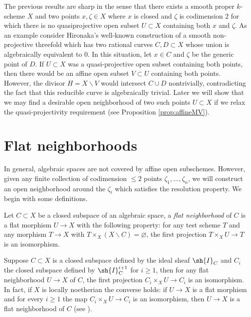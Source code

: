 \documentclass[12pt]{amsart}
\begin{document}
\begin{remark} The previous results are sharp in the sense that there exists a smooth proper $k$-scheme $X$ and two points $x,\zeta \in X$ where $x$ is closed and $\zeta$ is codimension $2$ for which there is no quasiprojective open subset $U \subset X$ containing both $x$ and $\zeta$. As an example consider Hironaka's well-known construction of a smooth non-projective threefold which has two rational curves $C,D \subset X$ whose union is algebraically equivalent to $0$. In this situation, let $x \in C$ and $\zeta$ be the generic point of $D$. If $U \subset X$ was a quasi-projective open subset containing both points, then there would be an affine open subset $V \subset U$ containing both points. However, the divisor $H=X \smallsetminus V$ would intersect $C \cup D$ nontrivially, contradicting the fact that this reducible curve is algebraically trivial. Later we will show that we may find a desirable open neighborhood of two such points $U \subset X$ if we relax the quasi-projectivity requirement (see Proposition \ref{prop:affineMV}). \end{remark}

\section{Flat neighborhoods} \label{Flat neighborhoods} 
In general, algebraic spaces are not covered by affine open subschemes. However, given any finite collection of codimension $\leq 2$ points $\zeta_1,...,\zeta_n$, we will construct an open neighborhood around the $\zeta_i$ which satisfies the resolution property. We begin with some definitions.

\begin{definition} \label{def:flatneighborhood} Let $C \subset X$ be a closed subspace of an algebraic space, a \emph{flat neighborhood} of $C$ is a flat morphism $U \to X$ with the following property: for any test scheme $T$ and any morphism $T \to X$ with $T \times_X (X \smallsetminus C) = \varnothing$, the first projection $T \times_X U \to T$ is an isomorphism. \end{definition}

\begin{remark} \label{rem:flatnotherian} Suppose $C \subset X$ is a closed subspace defined by the ideal sheaf $\sh{I}_C$ and $C_i$ the closed subspace defined by $\sh{I}_C^{i+1}$ for $i \geq 1$, then for any flat neighborhood $U \to X$ of $C$, the first projection $C_i \times_X U \to C_i$ is an isomorphism. In fact, if $X$ is locally noetherian the converse holds: if $U \to X$ is a flat morphism and for every $i \geq 1$ the map $C_i \times_X U \to C_i$ is an isomorphism, then $U \to X$ is a flat neighborhood of $C$ (see \cite[Lem 3.2, Lem. 3.3]{hall2016mayer}). \end{remark}
\end{document}
